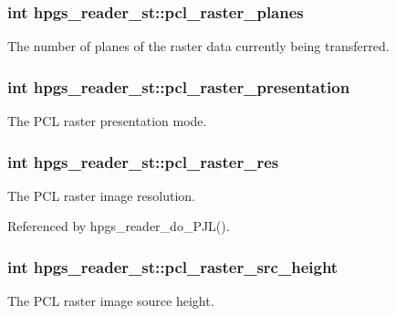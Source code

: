 \subsubsection[{pcl\_\-raster\_\-planes}]{\setlength{\rightskip}{0pt plus 5cm}int {\bf hpgs\_\-reader\_\-st::pcl\_\-raster\_\-planes}}\label{structhpgs__reader__st_a2be566b130835713d4ece66cc8634900}
The number of planes of the raster data currently being transferred. 
\subsubsection[{pcl\_\-raster\_\-presentation}]{\setlength{\rightskip}{0pt plus 5cm}int {\bf hpgs\_\-reader\_\-st::pcl\_\-raster\_\-presentation}}\label{structhpgs__reader__st_aa719fff507257e35bb1d8a75e5ad1547}
The PCL raster presentation mode. 
\subsubsection[{pcl\_\-raster\_\-res}]{\setlength{\rightskip}{0pt plus 5cm}int {\bf hpgs\_\-reader\_\-st::pcl\_\-raster\_\-res}}\label{structhpgs__reader__st_a95d3097681417f5b50f584c31d0ce5a9}
The PCL raster image resolution. 

Referenced by hpgs\_\-reader\_\-do\_\-PJL().

\subsubsection[{pcl\_\-raster\_\-src\_\-height}]{\setlength{\rightskip}{0pt plus 5cm}int {\bf hpgs\_\-reader\_\-st::pcl\_\-raster\_\-src\_\-height}}\label{structhpgs__reader__st_ad2526b16d2f3cd3a61def01e3723abbe}
The PCL raster image source height. 

